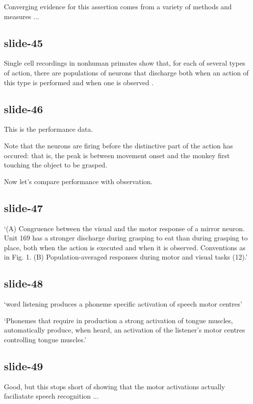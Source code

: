 \documentclass[12pt,\papersize]{extarticle}
\begin{document}
Converging evidence for this assertion comes from a variety of methods and measures ...

\subsection{slide-45}
Single cell recordings in nonhuman primates show that, for each of several types of action, there are
populations of neurons that discharge both when an action of this type is performed and when one is
observed \citep{pellegrino:1992_understanding, gallese:1996_action,Fogassi:2005nf}.

\subsection{slide-46}
This is the performance data.

Note that the neurons are firing before the distinctive part of the action has
occured: that is, the peak is between movement onset and the monkey first touching
the object to be grasped.

Now let’s compare
performance with observation.

\subsection{slide-47}
‘(A) Congruence between the visual and the motor response of a mirror neuron. Unit 169 has a stronger
discharge during grasping to eat than during grasping to place, both when the action is executed and
when it is observed. Conventions as in Fig. 1. (B) Population-averaged responses during motor and
visual tasks (12).’

\subsection{slide-48}
‘word listening produces a phoneme specific activation of speech motor centres’ \citep{Fadiga:2002kl}



‘Phonemes that require in production a strong activation of tongue muscles, automatically produce, when heard, an activation of the listener's motor centres controlling tongue muscles.’ \citep{Fadiga:2002kl}


\subsection{slide-49}
Good, but this stops short of showing that the motor activations
actually faciliatate speech recognition ...
\end{document}
